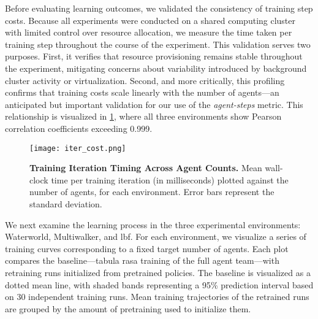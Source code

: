 Before evaluating learning outcomes, we validated the consistency of training step costs.
Because all experiments were conducted on a shared computing cluster with limited 
control over resource allocation, we measure the time taken per training
step throughout the course of the experiment. This validation serves two purposes. First, 
it verifies that resource provisioning remains stable throughout the experiment, 
mitigating concerns about variability introduced by background cluster activity or virtualization.
Second, and more critically, this profiling confirms that training costs scale linearly 
with the number of agents—an anticipated but important validation for our use of the 
\emph{agent-steps} metric. This relationship is visualized in \cref{con1:fig:agent-steps}, 
where all three environments show Pearson correlation coefficients exceeding 0.999.
\begin{figure}[!ht]
    \centering
    \texttt{[image: iter\_cost.png]}
    \caption{\textbf{Training Iteration Timing Across Agent Counts.}
        Mean wall-clock time per training iteration (in milliseconds) plotted against the number 
        of agents, for each environment. Error bars represent the standard deviation.}
    \label{con1:fig:agent-steps}
\end{figure}
%

We next examine the learning process in the three experimental environments: 
Waterworld, Multiwalker, and \gls{lbf}. For each environment, 
we visualize a series of training curves corresponding to a fixed target number of agents.
Each plot compares the baseline—tabula rasa training of the full agent team—with 
retraining runs initialized from pretrained policies.
The baseline is visualized as a dotted mean line, with shaded bands 
representing a 95\% prediction interval based on 30 independent training runs.
Mean training trajectories of the retrained runs are grouped by the amount 
of pretraining used to initialize them.

